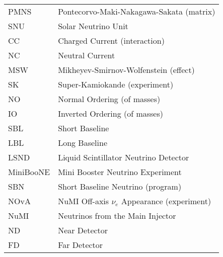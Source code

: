 \documentclass[12pt,a4paper]{report}
\begin{document}


\tableofcontents

\listoffigures

\listoftables

\begin{table}[H]
\begin{tabular}{ll}
PMNS       & Pontecorvo-Maki-Nakagawa-Sakata (matrix)          \\
SNU        & Solar Neutrino Unit                               \\
CC         & Charged Current (interaction)                     \\
NC         & Neutral Current                                   \\
MSW        & Mikheyev-Smirnov-Wolfenstein (effect)             \\
SK         & Super-Kamiokande (experiment)                     \\
NO         & Normal Ordering (of masses)                       \\
IO         & Inverted Ordering (of masses)                     \\
SBL        & Short Baseline                                    \\
LBL        & Long Baseline                                     \\
LSND       & Liquid Scintillator Neutrino Detector             \\
MiniBooNE  & Mini Booster Neutrino Experiment                  \\
SBN        & Short Baseline Neutrino (program)                 \\
NOvA       & NuMI Off-axis $\nu_e$ Appearance (experiment)     \\
NuMI       & Neutrinos from the Main Injector                  \\
ND         & Near Detector                                     \\
FD         & Far Detector                                      \\

\end{tabular}
\end{table}
\end{document}

